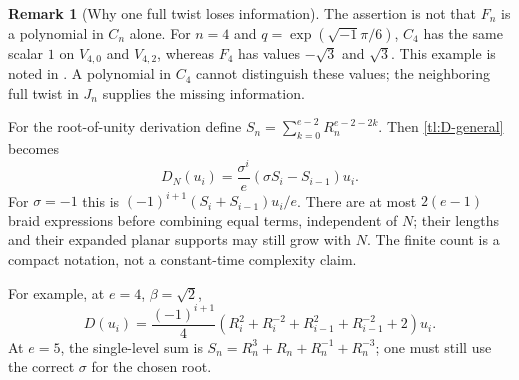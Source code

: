\documentclass[a4paper,11pt,oneside,reqno]{amsart}
\theoremstyle{definition}
\newtheorem{remark}[theorem]{Remark}
\numberwithin{equation}{section}
\begin{document}
	\begin{remark}[Why one full twist loses information]
		The assertion is not that $F_n$ is a polynomial in $C_n$ alone.
		For $n=4$ and $q=\exp(\sqrt{-1}\pi/6)$, $C_4$ has the same
		scalar $1$ on $V_{4,0}$ and $V_{4,2}$, whereas $F_4$ has values
		$-\sqrt3$ and $\sqrt3$.  This example is noted in
		\cite[Appendix~A]{RSA}.  A polynomial in $C_4$ cannot distinguish
		these values; the neighboring full twist in $J_n$ supplies the
		missing information.
	\end{remark}
	
	For the root-of-unity derivation define
	$S_n=\sum_{k=0}^{e-2}R_n^{e-2-2k}$.
	Then \eqref{tl:D-general} becomes
	\begin{equation}\label{tl:D-braid}
		\boxed{D_N(u_i)=\frac{\sigma^i}{e}
			(\sigma S_i-S_{i-1})u_i.}
	\end{equation}
	For $\sigma=-1$ this is $(-1)^{i+1}(S_i+S_{i-1})u_i/e$.
	There are at most $2(e-1)$ braid expressions before combining equal
	terms, independent of $N$; their lengths and their expanded planar
	supports may still grow with $N$.  The finite count is a compact
	notation, not a constant-time complexity claim.
	
	For example, at $e=4$, $\beta=\sqrt2$,
	\begin{equation}\label{tl:D-e4-braid}
		D(u_i)=\frac{(-1)^{i+1}}4
		(R_i^2+R_i^{-2}+R_{i-1}^2+R_{i-1}^{-2}+2)u_i.
	\end{equation}
	At $e=5$, the single-level sum is
	$S_n=R_n^3+R_n+R_n^{-1}+R_n^{-3}$; one must still use the correct
	$\sigma$ for the chosen root.
	
\end{document}

